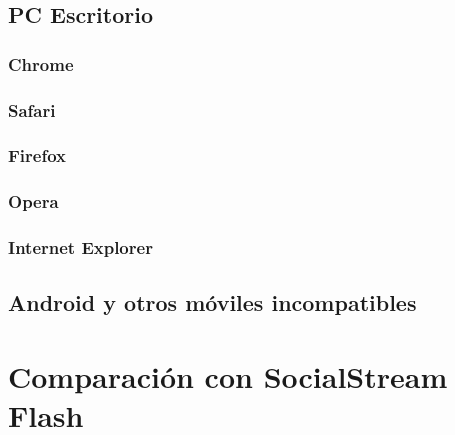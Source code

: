   \subsection{PC Escritorio}
    \subsubsection{Chrome}
    \subsubsection{Safari}
    \subsubsection{Firefox}
    \subsubsection{Opera}
    \subsubsection{Internet Explorer}
  \subsection{Android y otros móviles incompatibles}
\section{Comparación con SocialStream Flash}
